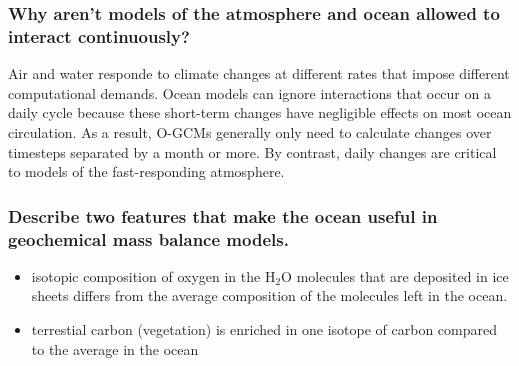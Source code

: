 \subsubsection{Why aren't models of the atmosphere and ocean allowed to
interact continuously?}
Air and water responde to climate changes at different rates that impose
different computational demands. Ocean models can ignore interactions that
occur on a daily cycle because these short-term changes have negligible effects
on most ocean circulation. As a result, O-GCMs generally only need to calculate
changes over timesteps separated by a month or more. By contrast, daily changes
are critical to models of the fast-responding atmosphere.

\subsubsection{Describe two features that make the ocean useful in geochemical
mass balance models.}
\begin{itemize}
	\item isotopic composition of oxygen in the H$_2$O molecules that are
	deposited in ice sheets differs from the average composition of the
	molecules left in the ocean.
	\item terrestial carbon (vegetation) is enriched in one isotope of
	carbon compared to the average in the ocean
\end{itemize}
